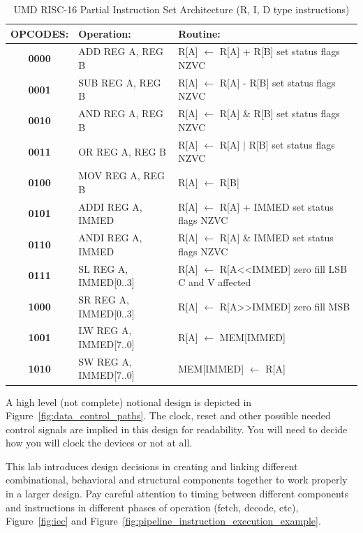 \documentclass{article}
\begin{document}
\begin{table}[!htbp]
  \begin{center}
    \begin{tabular}{|c|l|l|}
       \hline
       \rowcolor{gray!50}
       \large{\textbf{OPCODES:}} & \large{\textbf{Operation:}} & \large{\textbf{Routine:}} \\
       \hline 
       \textbf{0000} & ADD  REG A, REG B & R[A] $\leftarrow$ R[A] + R[B] set status flags NZVC  \\
       \textbf{0001} & SUB  REG A, REG B & R[A] $\leftarrow$ R[A] - R[B] set status flags NZVC  \\
       \textbf{0010} & AND  REG A, REG B & R[A] $\leftarrow$ R[A] \& R[B] set status flags NZVC  \\
       \textbf{0011} & OR   REG A, REG B & R[A] $\leftarrow$ R[A] $\mid$ R[B] set status flags NZVC  \\
       \textbf{0100} & MOV  REG A, REG B & R[A] $\leftarrow$ R[B] \\
       \textbf{0101} & ADDI REG A, IMMED & R[A] $\leftarrow$ R[A] + IMMED set status flags NZVC  \\
       \textbf{0110} & ANDI REG A, IMMED & R[A] $\leftarrow$ R[A] \& IMMED set status flags NZVC  \\
       \textbf{0111} & SL   REG A, IMMED[0..3] & R[A] $\leftarrow$  R[A\textless \textless IMMED] zero fill LSB C and V affected  \\
       \textbf{1000} & SR   REG A, IMMED[0..3] & R[A] $\leftarrow$ R[A\textgreater \textgreater IMMED] zero fill MSB  \\
       \textbf{1001} & LW   REG A, IMMED[7..0] & R[A] $\leftarrow$ MEM[IMMED]  \\
       \textbf{1010} & SW   REG A, IMMED[7..0] & MEM[IMMED] $\leftarrow$ R[A]  \\
       \hline
    \end{tabular}
  \end{center}
  \caption{UMD RISC-16 Partial Instruction Set Architecture (R, I, D type instructions)}
  \label{tab:riscise}
\end{table}
\FloatBarrier

A high level (not complete) notional design is depicted in Figure~\ref{fig:data_control_paths}. The clock, reset and other possible needed control signals are implied in this design for readability. You will need to decide how you will clock the devices or not at all.

This lab introduces design decisions in creating and linking different combinational, behavioral and structural components together to work properly in a larger design. Pay careful attention to timing between different components and instructions in different phases of operation (fetch, decode, etc), Figure~\ref{fig:iec} and Figure~\ref{fig:pipeline_instruction_execution_example}.
\end{document}
